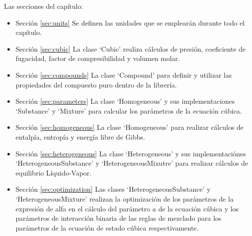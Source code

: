 	Las secciones del capítulo:
	\begin{itemize}
		\item{Sección} \ref{sec:units} Se definen las unidades que se emplearán durante todo el capítulo.
		\item{Sección} \ref{sec:cubic}  La clase `Cubic' realiza cálculos de presión, coeficiente de fugacidad, factor de compresibilidad y volumen molar.
		\item{Sección} \ref{sec:compounds} La clase `Compound' para definir y utilizar las propiedades del compuesto puro dentro de la librería.
		\item {Sección} \ref{sec:parameters} La clase `Homogeneous' y sus implementaciones `Substance' y `Mixture' para calcular los parámetros de la ecuación cúbica.
		\item {Sección} \ref{sec:homogeneous} La clase `Homogeneous' para realizar cálculos de entalpía, entropía y energía libre de Gibbs.
		\item {Sección} \ref{sec:heterogeneous} La clase `Heterogeneous' y sus implementaciónes `HeterogeneousSubstance' y `HeterogeneousMixutre' para realizar cálculos de equilibrio Líquido-Vapor.
		\item {Sección} \ref{sec:optimization} Las clases `HeterogeneousSubstance' y `HeterogeneousMixture' realizan la optimización de los parámetros de la expresión de alfa en el cálculo del parámetro $a$ de la ecuación cúbica y los parámetros de interacción binaria de las reglas de mezclado para los parámetros de la ecuación de estado cúbica respectivamente.
	\end{itemize}


				
